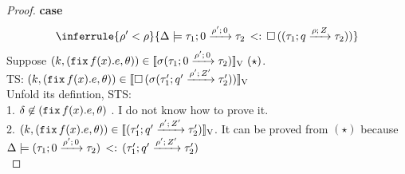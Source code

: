 \begin{proof}

\textbf{case}
\[
 \inferrule{
\dmap' < \dmap
    }{
       \Delta \models \sub{\tarr{\type_1}{\type_2}{0}{\dmap'}{0} }{  \tbox{(
          \tarr{\type_1}{\type_2}{\nnatbiA}{\dmap}{\nnatA} )  }
    } }
\]
Suppose  $ (\stepiA, (\efix f(x).\expr, \env) ) \in \lrv{\ienv (\tarr{\type_1}{\type_2}{0}{\dmap'}{0})  } ~(\star)$.\\
TS: $ (\stepiA, (\efix f(x).\expr, \env) ) \in \lrv{ \tbox{\ienv (\tarr{\type_1'}{\type_2'}{\nnatbiA'}{\dmap'}{\nnatA'})  } } $ \\
Unfold its defintion, STS:\\
1. $ \delta \not \in  (\efix f(x).\expr, \env)$ . I do not know how to prove it. \\
2.  $(\stepiA, (\efix f(x).\expr, \env) ) \in  \lrv{(\tarr{\type_1'}{\type_2'}{\nnatbiA'}{\dmap'}{\nnatA'})}
$.  It can be proved from $(\star)$ because $ \Delta \models \sub{ (\tarr{\type_1}{\type_2}{0}{\dmap'}{0})} { (\tarr{\type_1'}{\type_2'}{\nnatbiA'}{\dmap'}{\nnatA'}) }  $ \\


\end{proof}